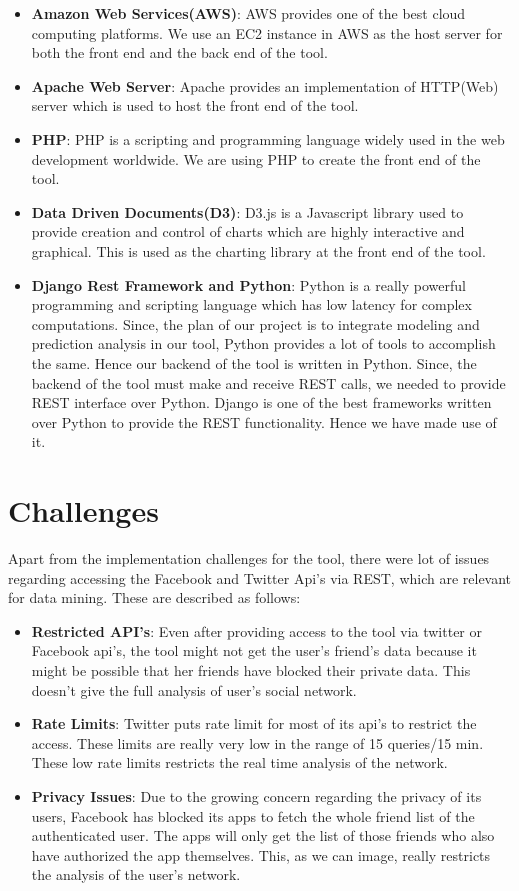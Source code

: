 \documentclass[12pt]{ucthesis}
\begin{document}
\begin{itemize}
  \item \textbf{Amazon Web Services(AWS)}: AWS provides one of the best cloud computing platforms. We use an EC2 instance in AWS as the host server for both the front end and the back end of the tool.
  \item \textbf{Apache Web Server}: Apache provides an implementation of HTTP(Web) server which is used to host the front end of the tool.
  \item \textbf{PHP}: PHP is a scripting and programming language widely used in the web development worldwide. We are using PHP to create the front end of the tool.
  \item \textbf{Data Driven Documents(D3)}: D3.js is a Javascript library used to provide creation and control of charts which are highly interactive and graphical. This is used as the charting library at the front end of the tool.
  \item \textbf{Django Rest Framework and Python}: Python is a really powerful programming and scripting language which has low latency for complex computations. Since, the plan of our project is to integrate modeling and prediction analysis in our tool, Python provides a lot of tools to accomplish the same. Hence our backend of the tool is written in Python. Since, the backend of the tool must make and receive REST calls, we needed to provide REST interface over Python. Django is one of the best frameworks written over Python to provide the REST functionality. Hence we have made use of it.
\end{itemize}

\section{Challenges}
Apart from the implementation challenges for the tool, there were lot of issues regarding accessing the Facebook and Twitter Api's via REST, which are relevant for data mining. These are described as follows:
\begin{itemize}
  \item \textbf{Restricted API's}: Even after providing access to the tool via twitter or Facebook api's, the tool might not get the user's friend's data because it might be possible that her friends have blocked their private data. This doesn't give the full analysis of user's social network.  
  \item \textbf{Rate Limits}: Twitter puts rate limit for most of its api's to restrict the access. These limits are really very low in the range of 15 queries/15 min. These low rate limits restricts the real time analysis of the network.
  \item \textbf{Privacy Issues}: Due to the growing concern regarding the privacy of its users, Facebook has blocked its apps to fetch the whole friend list of the authenticated user. The apps will only get the list of those friends who also have authorized the app themselves. This, as we can image, really restricts the analysis of the user's network.
\end{itemize}
\end{document}
